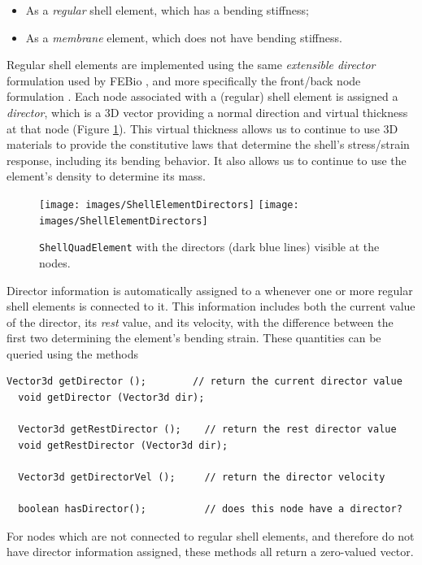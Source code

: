 \begin{itemize}

\item As a {\it regular} shell element, which has a bending stiffness;

\item As a {\it membrane} element, which does not have bending
stiffness.

\end{itemize}

Regular shell elements are implemented using the same {\it
extensible director} formulation used by FEBio \cite{MaasFEBio2012},
and more specifically the front/back node formulation
\cite{FEBioTheory2018}.  Each node associated with a (regular)
shell element is assigned a {\it director}, which is a 3D vector
providing a normal direction and virtual thickness at that node
(Figure \ref{ShellElementDirectors:fig}). This virtual thickness
allows us to continue to use 3D materials to provide
the constitutive laws that determine the
shell's stress/strain response, including its bending behavior. It
also allows us to continue to use the element's {\sf density} to
determine its mass.

\begin{figure}[ht]
\begin{center}
\iflatexml
 \texttt{[image: images/ShellElementDirectors]}
\else
 \texttt{[image: images/ShellElementDirectors]}
\fi
\end{center}
\caption{{\tt ShellQuadElement} with the directors (dark blue lines)
visible at the nodes.}
\label{ShellElementDirectors:fig}
\end{figure}

Director information is automatically assigned to a
 whenever one or more
regular shell elements is connected to it. This information includes both the
current value of the director, its {\it rest} value, and its velocity,
with the difference between the first two determining the element's
bending strain.  These quantities can be queried using the methods
%
\begin{lstlisting}[]
  Vector3d getDirector ();        // return the current director value
  void getDirector (Vector3d dir);

  Vector3d getRestDirector ();    // return the rest director value
  void getRestDirector (Vector3d dir);

  Vector3d getDirectorVel ();     // return the director velocity

  boolean hasDirector();          // does this node have a director?
\end{lstlisting}
%
For nodes which are not connected to regular shell elements, and
therefore do not have director information assigned, these methods all
return a zero-valued vector.

